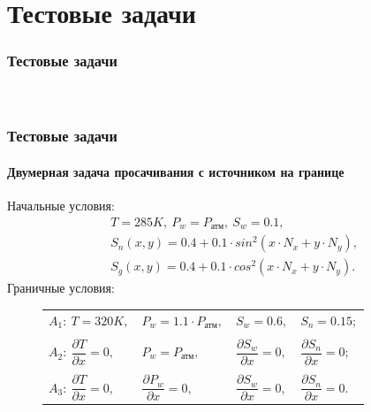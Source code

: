 \section{Тестовые задачи}

\begin{frame}
\begin{center}
\frametitle{Тестовые задачи}
\framesubtitle{\ }
\end{center}
\end{frame}

\begin{frame}
\frametitle{Тестовые задачи}
\framesubtitle{Двумерная задача просачивания с источником на границе}
\begin{center}
Начальные условия: 
\begin{equation*}
  \begin{aligned}
    &T=285K,\ P_w=P_\text{атм},\ S_w=0.1,\\
    &S_n(x, y)=0.4 + 0.1 \cdot sin^2(x \cdot N_x + y \cdot N_y),\\
    &S_g(x, y)=0.4 + 0.1 \cdot cos^2(x \cdot N_x + y \cdot N_y).
   \end{aligned}
\end{equation*}
Граничные условия:
\begin{figure}
\begin{minipage}[h]{0.24\textwidth}
\end{minipage}
\hfill
\begin{minipage}[h]{0.75\textwidth}
  \begin{tabular}{ l l l l }
    $A_1:\ T=320K,$ & $P_w=1.1\cdot P_{\text{атм}},$ & $S_w=0.6,$ & $S_n=0.15;$\\
      & & & \\
    $A_2:\ \dfrac{\partial{T}}{\partial{x}}=0,$ & ${P_w}=P_{\text{атм}},$ & $\dfrac{\partial{S_w}}{\partial{x}}=0,$ & $\dfrac{\partial{S_n}}{\partial{x}}=0;$\\
      & & & \\
    $A_3:\ \dfrac{\partial{T}}{\partial{x}}=0,$ & $\dfrac{\partial{P_w}}{\partial{x}}=0,$ & $\dfrac{\partial{S_w}}{\partial{x}}=0,$ & $\dfrac{\partial{S_n}}{\partial{x}}=0.$
  \end{tabular}
\end{minipage}
\end{figure}
\end{center}
\end{frame}

